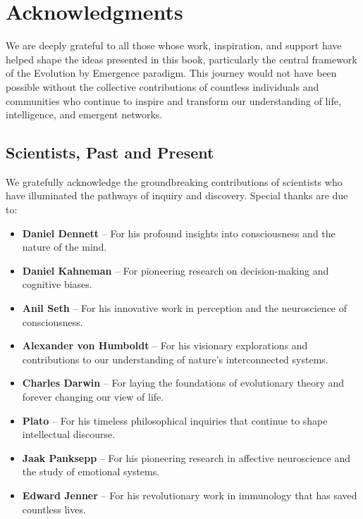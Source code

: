 \chapter*{Acknowledgments}

We are deeply grateful to all those whose work, inspiration, and support have helped shape the ideas presented in this book, particularly the central framework of the Evolution by Emergence paradigm. This journey would not have been possible without the collective contributions of countless individuals and communities who continue to inspire and transform our understanding of life, intelligence, and emergent networks. %


\section*{Scientists, Past and Present}
We gratefully acknowledge the groundbreaking contributions of scientists who have illuminated the pathways of inquiry and discovery. Special thanks are due to:
\begin{itemize}
    \item \textbf{Daniel Dennett} – For his profound insights into consciousness and the nature of the mind.
    \item \textbf{Daniel Kahneman} – For pioneering research on decision-making and cognitive biases.
    \item \textbf{Anil Seth} – For his innovative work in perception and the neuroscience of consciousness.
    \item \textbf{Alexander von Humboldt} – For his visionary explorations and contributions to our understanding of nature’s interconnected systems.
    \item \textbf{Charles Darwin} – For laying the foundations of evolutionary theory and forever changing our view of life.
    \item \textbf{Plato} – For his timeless philosophical inquiries that continue to shape intellectual discourse.
    \item \textbf{Jaak Panksepp} – For his pioneering research in affective neuroscience and the study of emotional systems.
    \item \textbf{Edward Jenner} – For his revolutionary work in immunology that has saved countless lives.
\end{itemize}

